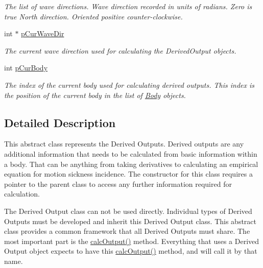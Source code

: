 \begin{DoxyCompactItemize}
\begin{DoxyCompactList}\small\item\em The list of wave directions. Wave direction recorded in units of radians. Zero is true North direction. Oriented positive counter-\/clockwise. \end{DoxyCompactList}\item 
\hypertarget{class_output_derived_a408bb4755c3f283773bc3d8923f7e7f4}{int $\ast$ \hyperlink{class_output_derived_a408bb4755c3f283773bc3d8923f7e7f4}{p\-Cur\-Wave\-Dir}}\label{class_output_derived_a408bb4755c3f283773bc3d8923f7e7f4}

\begin{DoxyCompactList}\small\item\em The current wave direction used for calculating the Derived\-Output objects. \end{DoxyCompactList}\item 
\hypertarget{class_output_derived_acf0ac8dbd4ead154a92d7d77d8893c1b}{int \hyperlink{class_output_derived_acf0ac8dbd4ead154a92d7d77d8893c1b}{p\-Cur\-Body}}\label{class_output_derived_acf0ac8dbd4ead154a92d7d77d8893c1b}

\begin{DoxyCompactList}\small\item\em The index of the current body used for calculating derived outputs. This index is the position of the current body in the list of \hyperlink{class_body}{Body} objects. \end{DoxyCompactList}\end{DoxyCompactItemize}


\subsection{Detailed Description}
This abstract class represents the Derived Outputs. Derived outputs are any additional information that needs to be calculated from basic information within a body. That can be anything from taking derivatives to calculating an empirical equation for motion sickness incidence. The constructor for this class requires a pointer to the parent class to access any further information required for calculation.

The Derived Output class can not be used directly. Individual types of Derived Outputs must be developed and inherit this Derived Output class. This abstract class provides a common framework that all Derived Outputs must share. The most important part is the \hyperlink{class_output_derived_a7a65864e45519edfe7fe45c408457f41}{calc\-Output()} method. Everything that uses a Derived Output object expects to have this \hyperlink{class_output_derived_a7a65864e45519edfe7fe45c408457f41}{calc\-Output()} method, and will call it by that name.


